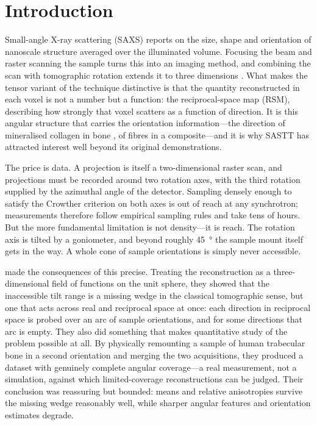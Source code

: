 \documentclass[11pt,a4paper]{article}
\begin{document}
\section{Introduction}
\label{sec:intro}

Small-angle X-ray scattering (SAXS) reports on the size, shape and orientation of
nanoscale structure averaged over the illuminated volume. Focusing the beam and raster
scanning the sample turns this into an imaging method, and combining the scan with
tomographic rotation extends it to three dimensions \citep{Liebi2015,Schaff2015}. What
makes the tensor variant of the technique distinctive is that the quantity reconstructed
in each voxel is not a number but a function: the reciprocal-space map (RSM), describing
how strongly that voxel scatters as a function of direction. It is this angular structure
that carries the orientation information---the direction of mineralised collagen in bone
\citep{Georgiadis2015}, of fibres in a composite---and it is why SASTT has attracted
interest well beyond its original demonstrations.

The price is data. A projection is itself a two-dimensional raster scan, and projections
must be recorded around two rotation axes, with the third rotation supplied by the
azimuthal angle of the detector. Sampling densely enough to satisfy the Crowther criterion
\citep{Crowther1970} on both axes is out of reach at any synchrotron; measurements
therefore follow empirical sampling rules and take tens of hours. But the more fundamental
limitation is not density---it is reach. The rotation axis is tilted by a goniometer, and
beyond roughly \SI{45}{\degree} the sample mount itself gets in the way. A whole cone of
sample orientations is simply never accessible.

\citet{Nielsen2024} made the consequences of this precise. Treating the reconstruction as
a three-dimensional field of functions on the unit sphere, they showed that the
inaccessible tilt range is a missing wedge in the classical tomographic sense, but one
that acts across real and reciprocal space at once: each direction in reciprocal space is
probed over an arc of sample orientations, and for some directions that arc is empty. They
also did something that makes quantitative study of the problem possible at all. By
physically remounting a sample of human trabecular bone in a second orientation and
merging the two acquisitions, they produced a dataset with genuinely complete angular
coverage---a real measurement, not a simulation, against which limited-coverage
reconstructions can be judged. Their conclusion was reassuring but bounded: means and
relative anisotropies survive the missing wedge reasonably well, while sharper angular
features and orientation estimates degrade.
\end{document}
